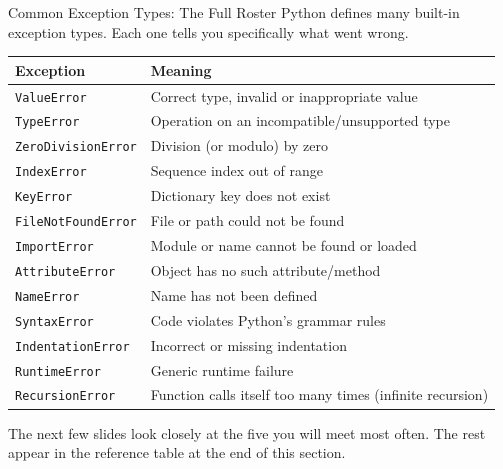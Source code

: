 \documentclass[9pt,aspectratio=169,xcolor=table]{beamer}
\newcommand{\striped}{\rowcolors{1}{white}{stripe}}
\begin{document}
\begin{frame}{Common Exception Types: The Full Roster}
    \leavevmode
    \small
    Python defines many built-in exception types. Each one tells you
    specifically what went wrong.

    \vspace{2mm}
    \striped
    \begin{center}
    \scriptsize
    \begin{tabular}{@{}ll@{}}
    \toprule
    \textbf{Exception} & \textbf{Meaning} \\
    \midrule
    \texttt{ValueError} & Correct type, invalid or inappropriate value \\
    \texttt{TypeError} & Operation on an incompatible/unsupported type \\
    \texttt{ZeroDivisionError} & Division (or modulo) by zero \\
    \texttt{IndexError} & Sequence index out of range \\
    \texttt{KeyError} & Dictionary key does not exist \\
    \texttt{FileNotFoundError} & File or path could not be found \\
    \texttt{ImportError} & Module or name cannot be found or loaded \\
    \texttt{AttributeError} & Object has no such attribute/method \\
    \texttt{NameError} & Name has not been defined \\
    \texttt{SyntaxError} & Code violates Python's grammar rules \\
    \texttt{IndentationError} & Incorrect or missing indentation \\
    \texttt{RuntimeError} & Generic runtime failure \\
    \texttt{RecursionError} & Function calls itself too many times (infinite recursion) \\
    \bottomrule
    \end{tabular}
    \end{center}

    \vspace{2mm}
    {\scriptsize The next few slides look closely at the five you will
    meet most often. The rest appear in the reference table at the end
    of this section.}
\end{frame}
\end{document}
